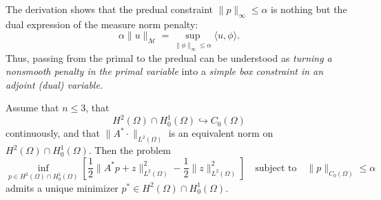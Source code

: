 \documentclass[11pt,a4paper]{article}
\begin{document}
\begin{remark}
The derivation shows that the predual constraint $\|p\|_\infty\le\alpha$ is nothing but the dual
expression of the measure norm penalty:
\[
\alpha\|u\|_{\mathcal{M}}
=\sup_{\|\phi\|_\infty\le\alpha} \langle u,\phi\rangle.
\]
Thus, passing from the primal to the predual can be understood as \emph{turning a nonsmooth penalty in the primal variable}
into a \emph{simple box constraint in an adjoint (dual) variable}.
\end{remark}

\begin{theorem}
\label{thm:predual_existence_measure}
Assume that $n\le 3$, that
\[
H^2(\Omega)\cap H_0^1(\Omega) \hookrightarrow C_0(\Omega)
\]
continuously, and that $\|A^*\cdot\|_{L^2(\Omega)}$ is an equivalent norm on
$H^2(\Omega)\cap H_0^1(\Omega)$.
Then the problem
\begin{equation}
\label{eq:predual_problem_measure}
\inf_{p\in H^2(\Omega)\cap H_0^1(\Omega)}
\left[
\frac12\|A^*p+z\|_{L^2(\Omega)}^2-\frac12\|z\|_{L^2(\Omega)}^2
\right]
\quad\text{subject to}\quad
\|p\|_{C_0(\Omega)}\le \alpha
\end{equation}
admits a unique minimizer $p^*\in H^2(\Omega)\cap H_0^1(\Omega)$.
\end{theorem}
\end{document}
